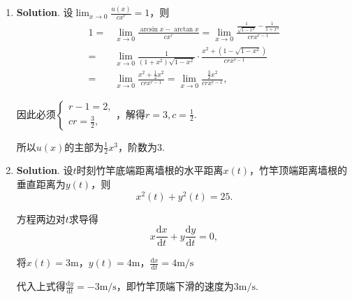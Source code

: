 \documentclass[../Main.tex]{subfiles}
\begin{document}
\begin{enumerate}
          所以$f''(1)=-3$.

    \item \textbf{Solution}. 设$\lim_{x\to0}\frac{u(x)}{cx^{r}}=1$，则
          \[
              \begin{aligned}
                  1= & \lim_{x\to0}\frac{\arcsin x-\arctan x}{cx^{r}}=\lim_{x\to0}\frac{\frac{1}{\sqrt{1-x^{2}}}-\frac{1}{1+x^{2}}}{crx^{r-1}} \\
                  =  & \lim_{x\to0}\frac{1}{(1+x^{2})\sqrt{1-x^2}}\cdot\frac{x^{2}+(1-\sqrt{1-x^2})}{crx^{r-1}}                                \\
                  =  & \lim_{x\to0}\frac{x^2+\frac{1}{2}x^2}{crx^{r-1}}=\lim_{x\to0}\frac{\frac{3}{2}x^2}{crx^{r-1}},
              \end{aligned}
          \]

          因此必须$\begin{cases}
                  r-1=2, \\
                  cr=\frac{3}{2},
              \end{cases}$，解得$r=3,c=\frac{1}{2}$.

          所以$u(x)$的主部为$\frac{1}{2}x^{3}$，阶数为3.

    \item \textbf{Solution}. 设$t$时刻竹竿底端距离墙根的水平距离$x(t)$，竹竿顶端距离墙根的垂直距离为$y
              (t)$，则
          \[
              x^{2}(t)+y^{2}(t)=25.
          \]

          方程两边对$t$求导得
          \[
              x\frac{\mathrm{d}x}{\mathrm{d}t}+y\frac{\mathrm{d}y}{\mathrm{d}t}=0,
          \]

          将$x(t)=3\mathrm{m}$，$y(t)=4\mathrm{m}$，$\frac{\mathrm{d}x}{\mathrm{d}t}=
              4\mathrm{m/s}$

          代入上式得$\frac{\mathrm{d}y}{\mathrm{d}t}=-3\mathrm{m/s}$，即竹竿顶端下滑的速度为$3
              \mathrm{m/s}$.
\end{enumerate}
\end{document}
